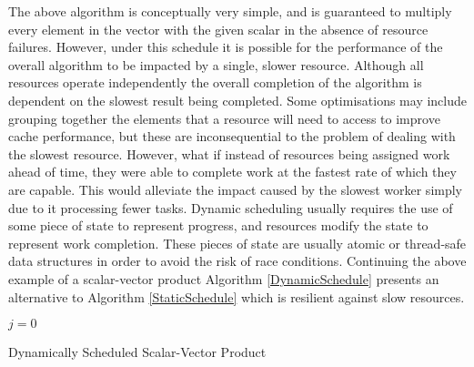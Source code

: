 \documentclass[12pt]{article}
\begin{document}
The above algorithm is conceptually very simple, and is guaranteed to multiply every element in the vector with the given scalar in the absence of resource failures. 
\newline
However, under this schedule it is possible for the performance of the overall algorithm to be impacted by a single, slower resource. Although all resources operate independently the overall completion of the algorithm is dependent on the slowest result being completed. 
\newline
Some optimisations may include grouping together the elements that a resource will need to access to improve cache performance, but these are inconsequential to the problem of dealing with the slowest resource.
\newline
However, what if instead of resources being assigned work ahead of time, they were able to complete work at the fastest rate of which they are capable. This would alleviate the impact caused by the slowest worker simply due to it processing fewer tasks.
\newline
\newline
Dynamic scheduling usually requires the use of some piece of state to represent progress, and resources modify the state to represent work completion. These pieces of state are usually atomic or thread-safe data structures in order to avoid the risk of race conditions.
\newline
Continuing the above example of a scalar-vector product Algorithm \ref{DynamicSchedule} presents an alternative to Algorithm \ref{StaticSchedule} which is resilient against slow resources.
\newline

\IncMargin{1em}
\begin{algorithm}[H]
 \BlankLine
 
 $j = 0$\;
 \caption{Dynamically Scheduled Scalar-Vector Product}
 \label{DynamicSchedule}
\end{algorithm}
\DecMargin{1em}
\medskip
\end{document}
